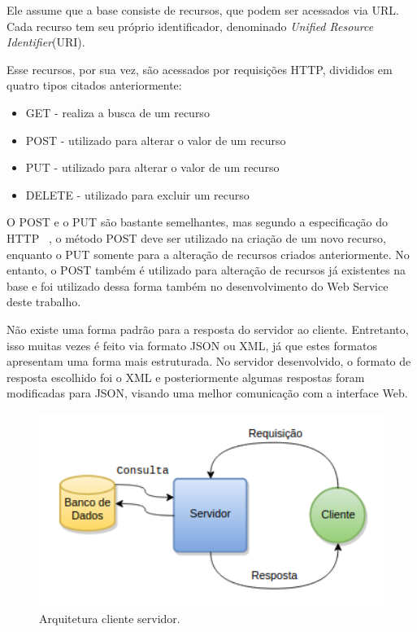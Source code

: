 Ele assume que a base consiste de recursos, que podem ser acessados via URL. Cada recurso tem seu próprio identificador, denominado \textit{Unified Resource Identifier}(URI).


Esse recursos, por sua vez, são acessados por requisições HTTP, divididos em quatro tipos citados anteriormente:

\begin{itemize}
\item GET - realiza a busca de um recurso
\item POST - utilizado para alterar o valor de um recurso
\item PUT - utilizado para alterar o valor de um recurso
\item DELETE - utilizado para excluir um recurso
\end{itemize}

O POST e o PUT são bastante semelhantes, mas segundo a especificação do HTTP ~\cite{RFC2616}, o método POST deve ser utilizado na criação de um novo recurso, enquanto o PUT somente para a alteração de recursos criados anteriormente. No entanto, o POST também é utilizado para alteração de recursos já existentes na base e foi utilizado dessa forma também no desenvolvimento do Web Service deste trabalho.

Não existe uma forma padrão para a resposta do servidor ao cliente. Entretanto, isso muitas vezes é feito via formato JSON ou XML, já que estes formatos apresentam uma forma mais estruturada. No servidor desenvolvido, o formato de resposta escolhido foi o XML e posteriormente algumas respostas foram modificadas para JSON, visando uma melhor comunicação com a interface Web.

\begin{figure}[clientserver]
\centering
\includegraphics[width=1.0\textwidth]{figs/clientserver}
\caption[Arquitetura cliente servidor.]
{Arquitetura cliente servidor.}
\label{fig:clientserver}
\end{figure}


